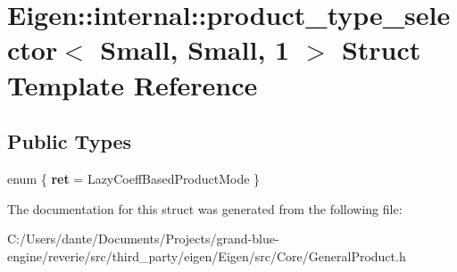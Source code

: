 \hypertarget{struct_eigen_1_1internal_1_1product__type__selector_3_01_small_00_01_small_00_011_01_4}{}\section{Eigen\+::internal\+::product\+\_\+type\+\_\+selector$<$ Small, Small, 1 $>$ Struct Template Reference}
\label{struct_eigen_1_1internal_1_1product__type__selector_3_01_small_00_01_small_00_011_01_4}
\subsection*{Public Types}
\begin{DoxyCompactItemize}
\item 
\mbox{\label{struct_eigen_1_1internal_1_1product__type__selector_3_01_small_00_01_small_00_011_01_4_a3f3fbe07b2423464def37c35730c57e7}} 
enum \{ {\bfseries ret} = Lazy\+Coeff\+Based\+Product\+Mode
 \}
\end{DoxyCompactItemize}


The documentation for this struct was generated from the following file\+:\begin{DoxyCompactItemize}
\item 
C\+:/\+Users/dante/\+Documents/\+Projects/grand-\/blue-\/engine/reverie/src/third\+\_\+party/eigen/\+Eigen/src/\+Core/General\+Product.\+h\end{DoxyCompactItemize}
